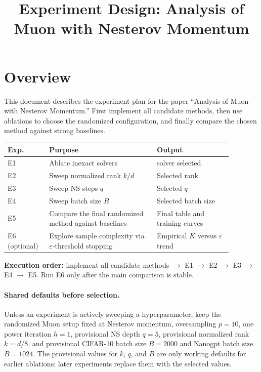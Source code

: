 \documentclass[11pt]{article}
\title{Experiment Design: Analysis of Muon with Nesterov Momentum}
\author{}
\date{}
\begin{document}
\maketitle

\section{Overview}

This document describes the experiment plan for the paper ``Analysis of Muon with Nesterov Momentum.'' First implement all candidate methods, then use ablations to choose the randomized configuration, and finally compare the chosen method against strong baselines.

\begin{table}[ht]
\centering
\begin{tabular}{L{0.15\linewidth}L{0.43\linewidth}L{0.30\linewidth}}
\toprule
\textbf{Exp.} & \textbf{Purpose} & \textbf{Output} \\
\midrule
E1 & Ablate inexact solvers & solver selected \\
E2 & Sweep normalized rank $k/d$ & Selected rank \\
E3 & Sweep NS steps $q$ & Selected $q$ \\
E4 & Sweep batch size $B$ & Selected batch size \\
E5 & Compare the final randomized method against baselines & Final table and training curves \\
E6 (optional) & Explore sample complexity via $\varepsilon$-threshold stopping & Empirical $K$ versus $\varepsilon$ trend \\
\bottomrule
\end{tabular}
\end{table}

\noindent\textbf{Execution order:} implement all candidate methods $\to$ E1 $\to$ E2 $\to$ E3 $\to$ E4 $\to$ E5. Run E6 only after the main comparison is stable.

\paragraph{Shared defaults before selection.} Unless an experiment is actively sweeping a hyperparameter, keep the randomized Muon setup fixed at Nesterov momentum, oversampling $p=10$, one power iteration $h=1$, provisional NS depth $q=5$, provisional normalized rank $k = d/8$, and provisional CIFAR-10 batch size $B=2000$ and Nanogpt batch size $B=1024$. The provisional values for $k$, $q$, and $B$ are only working defaults for earlier ablations; later experiments replace them with the selected values.
\end{document}
